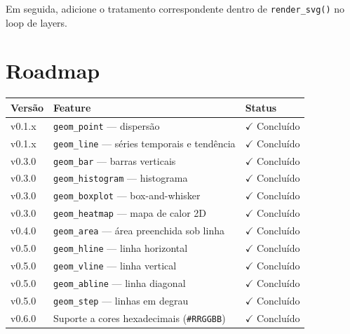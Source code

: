 \documentclass[12pt, a4paper, oneside]{book}
\newcommand{\code}[1]{\texttt{#1}}
\begin{document}
Em seguida, adicione o tratamento correspondente dentro de \code{render\_svg()}
no loop de layers.

\chapter{Roadmap}

\begin{center}
  \begin{tabularx}{\textwidth}{@{}lXl@{}}
    \toprule
    \textbf{Versão} & \textbf{Feature}                                           & \textbf{Status} \\
    \midrule
    v0.1.x & \code{geom\_point} --- dispers\~{a}o                                  & $\checkmark$ Conclu\'{i}do \\
    v0.1.x & \code{geom\_line} --- s\'{e}ries temporais e tend\^{e}ncia               & $\checkmark$ Conclu\'{i}do \\
    v0.3.0 & \code{geom\_bar} --- barras verticais                              & $\checkmark$ Conclu\'{i}do \\
    v0.3.0 & \code{geom\_histogram} --- histograma                              & $\checkmark$ Conclu\'{i}do \\
    v0.3.0 & \code{geom\_boxplot} --- box-and-whisker                           & $\checkmark$ Conclu\'{i}do \\
    v0.3.0 & \code{geom\_heatmap} --- mapa de calor 2D                           & $\checkmark$ Conclu\'{i}do \\
    v0.4.0 & \code{geom\_area} --- área preenchida sob linha                    & $\checkmark$ Conclu\'{i}do \\
    v0.5.0 & \code{geom\_hline} --- linha horizontal                             & $\checkmark$ Conclu\'{i}do \\
    v0.5.0 & \code{geom\_vline} --- linha vertical                               & $\checkmark$ Conclu\'{i}do \\
    v0.5.0 & \code{geom\_abline} --- linha diagonal                               & $\checkmark$ Conclu\'{i}do \\
    v0.5.0 & \code{geom\_step} --- linhas em degrau                              & $\checkmark$ Conclu\'{i}do \\
    v0.6.0 & Suporte a cores hexadecimais (\code{\#RRGGBB})                     & $\checkmark$ Conclu\'{i}do \\

\end{tabularx}
\end{center}
\end{document}
